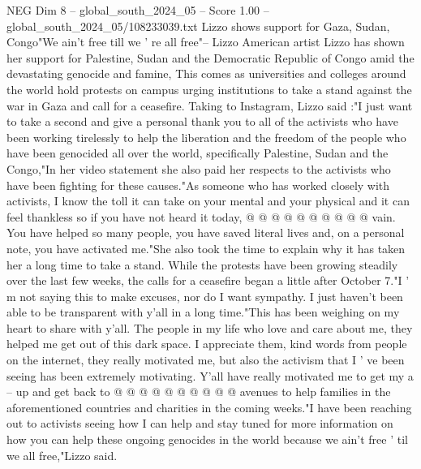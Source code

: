 \begin{textsample}{NEG Dim 8 – global\_south\_2024\_05 – Score 1.00 – global\_south\_2024\_05/108233039.txt}  \label{ex:f8_neg_235}
Lizzo shows support for Gaza, Sudan, Congo"We ain't free till we ' re all free"-- Lizzo American artist Lizzo has shown her support for Palestine, Sudan and the Democratic Republic of Congo amid the devastating genocide and famine, This comes as universities and colleges around the world hold protests on campus urging institutions to take a stand against the war in Gaza and call for a ceasefire.
Taking to Instagram, Lizzo said :"I just want to take a second and give a personal thank you to all of the activists who have been working tirelessly to help the liberation and the freedom of the people who have been genocided all over the world, specifically Palestine, Sudan and the Congo,"In her video statement she also paid her respects to the activists who have been fighting for these causes."As someone who has worked closely with activists, I know the toll it can take on your mental and your physical and it can feel thankless so if you have not heard it today, @ @ @ @ @ @ @ @ @ @ vain.
You have helped so many people, you have saved literal lives and, on a personal note, you have activated me."She also took the time to explain why it has taken her a long time to take a stand.
While the protests have been growing steadily over the last few weeks, the calls for a ceasefire began a little after October 7."I ' m not saying this to make excuses, nor do I want sympathy.
I just haven't been able to be transparent with y'all in a long time."This has been weighing on my heart to share with y'all.
The people in my life who love and care about me, they helped me get out of this dark space.
I appreciate them, kind words from people on the internet, they really motivated me, but also the activism that I ' ve been seeing has been extremely motivating.
Y'all have really motivated me to get my a -- up and get back to @ @ @ @ @ @ @ @ @ @ avenues to help families in the aforementioned countries and charities in the coming weeks."I have been reaching out to activists seeing how I can help and stay tuned for more information on how you can help these ongoing genocides in the world because we ain't free ' til we all free,"Lizzo said.

\end{textsample}
